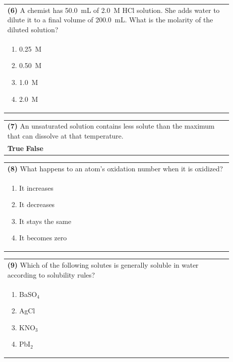 \documentclass{article}
\begin{document}
\noindent\begin{tabular}{|p{0.9\linewidth}|}
\hline
\textbf{(6)} A chemist has 50.0~mL of 2.0~M HCl solution. She adds water to dilute it to a final volume of 200.0~mL. What is the molarity of the diluted solution?\\[0.2cm]
\begin{minipage}[t]{0.85\linewidth}
\begin{enumerate}[label=\alph*.]
\item 0.25~M
\item 0.50~M
\item 1.0~M
\item 2.0~M
\end{enumerate}
\end{minipage}\\[0.2cm]
\hline
\end{tabular}

\noindent\begin{tabular}{|p{0.9\linewidth}|}
\hline
\textbf{(7)} An unsaturated solution contains less solute than the maximum that can dissolve at that temperature.\\[0.2cm]
\textbf{True} \hspace{1cm} \textbf{False}\\[0.2cm]
\hline
\end{tabular}

\noindent\begin{tabular}{|p{0.9\linewidth}|}
\hline
\textbf{(8)} What happens to an atom's oxidation number when it is oxidized?\\[0.2cm]
\begin{minipage}[t]{0.85\linewidth}
\begin{enumerate}[label=\alph*.]
\item It increases
\item It decreases
\item It stays the same
\item It becomes zero
\end{enumerate}
\end{minipage}\\[0.2cm]
\hline
\end{tabular}

\noindent\begin{tabular}{|p{0.9\linewidth}|}
\hline
\textbf{(9)} Which of the following solutes is generally soluble in water according to solubility rules?\\[0.2cm]
\begin{minipage}[t]{0.85\linewidth}
\begin{enumerate}[label=\alph*.]
\item BaSO$_4$
\item AgCl
\item KNO$_3$
\item PbI$_2$
\end{enumerate}
\end{minipage}\\[0.2cm]
\hline
\end{tabular}
\end{document}
